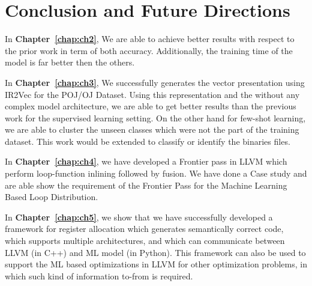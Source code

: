 \chapter{Conclusion and Future Directions}
\label{chap:conclude}


In \textbf{Chapter~\ref{chap:ch2}}, We are able to achieve better results with respect to the prior work in term of both accuracy. Additionally, the training time of the model is far better then the others. \newline

In \textbf{Chapter~\ref{chap:ch3}}, We successfully generates the vector presentation using IR2Vec for the POJ/OJ Dataset. Using this representation and the without any complex model architecture, we are able to get better results than the previous work for the supervised learning setting. On the other hand for few-shot learning, we are  able to cluster the unseen classes which were not the part of the training dataset. This work would be extended to classify or identify the binaries files. \newline

In \textbf{Chapter~\ref{chap:ch4}}, we have developed a Frontier pass in LLVM which perform loop-function inlining followed by fusion. We have done a Case study and are able show the requirement of the Frontier Pass for the Machine Learning Based Loop Distribution. \newline

In \textbf{Chapter~\ref{chap:ch5}}, we show that we have successfully developed a framework for register allocation which generates semantically correct code, which supports multiple architectures, and which can communicate between LLVM (in C++) and ML model (in Python). This framework can also be used to support the ML based optimizations in LLVM for other optimization problems, in which such kind of information to-from is required.
